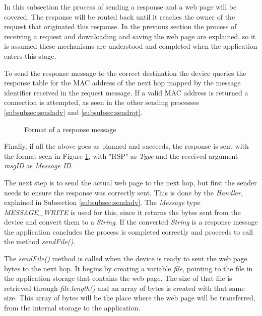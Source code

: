 In this subsection the process of sending a response and a web page will be covered. The response will be routed back until it reaches the owner of the request that originated this response. In the previous section the process of receiving a request and downloading and saving the web page are explained, so it is assumed these mechanisms are understood and completed when the application enters this stage.

To send the response message to the correct destination the device queries the response table for the \gls{MAC} address of the next hop mapped by the message identifier received in the request message. If a valid \gls{MAC} address is returned a connection is attempted, as seen in the other sending processes \ref{subsubsec:sendadv} and \ref{subsubsec:sendrqt}.

\begin{figure}[ht]
   \noindent{}
	\caption{\label{fig:rspmsg} Format of a response message}
\end{figure}

Finally, if all the above goes as planned and succeeds, the response is sent with the format seen in Figure \ref{fig:rspmsg}, with "RSP" as \textit{Type} and the received argument \textit{msgID} as \textit{Message ID}.

The next step is to send the actual web page to the next hop, but first the sender needs to ensure the response was correctly sent. This is done by the \textit{Handler}, explained in Subsection \ref{subsubsec:sendadv}. The \textit{Message} type \textit{MESSAGE\_WRITE} is used for this, since it returns the bytes sent from the device and convert them to a \textit{String}. If the converted \textit{String} is a response message the application concludes the process is completed correctly and proceeds to call the method \textit{sendFile()}.

The \textit{sendFile()} method is called when the device is ready to sent the web page bytes to the next hop. It begins by creating a variable \textit{file}, pointing to the file in the application storage that contains the web page. The size of that file is retrieved through \textit{file.length()} and an array of bytes is created with that same size. This array of bytes will be the place where the web page will be transferred, from the internal storage to the application.

